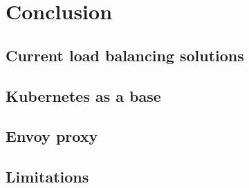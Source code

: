 \chapter{Conclusion}

\section{Current load balancing solutions}

\section{Kubernetes as a base}

\section{Envoy proxy}

\section{Limitations}